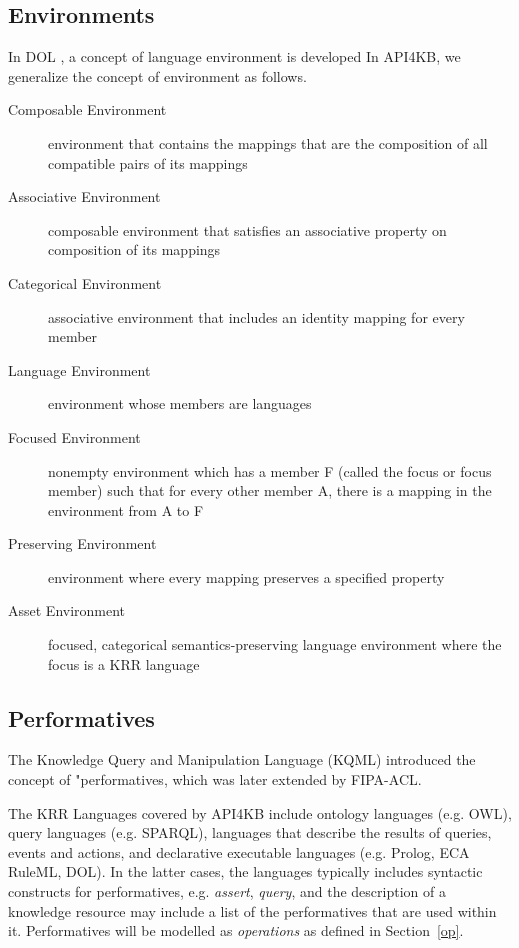 \documentclass[runningheads]{llncs}
\begin{document}
\subsection{Environments}
In DOL  , a concept of language environment is developed 
In API4KB, we generalize the concept of environment as follows.
\label{krassetenv}
\begin{description}
\item[Composable Environment] environment that contains the mappings that are the composition of all compatible pairs of its mappings
\item[Associative Environment] composable environment that satisfies an associative property on composition of its mappings
\item[Categorical Environment] associative environment that includes an identity mapping for every member
\item[Language Environment] environment whose members are languages
\item[Focused Environment] nonempty environment which has a member F (called the focus or focus member) such that for every other member A, there is a mapping in the environment from A to F
\item[Preserving Environment] environment where every mapping preserves a specified property
\item[Asset Environment] focused, categorical semantics-preserving language environment where the focus is a KRR language
\end{description}

\subsection{Performatives}
The Knowledge Query and Manipulation Language (KQML)  introduced the concept of "performatives, which was later extended by FIPA-ACL.

The KRR Languages covered by API4KB include ontology languages (e.g. OWL), query languages (e.g. SPARQL), languages that describe the results of queries, events and actions, and declarative executable languages (e.g. Prolog, ECA RuleML, DOL). In the latter cases, the languages typically includes syntactic constructs for performatives, e.g. \emph{assert}, \emph{query}, and the description of a knowledge resource may include a list of the performatives that are used within it.  Performatives will be modelled as \emph{operations} as defined in Section~\ref{op}.
\end{document}
